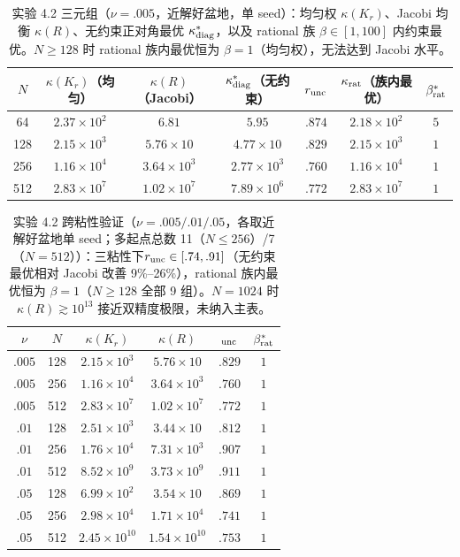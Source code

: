 \documentclass[fontset=windows,11pt]{ctexart}
\numberwithin{equation}{section}
\begin{document}
\begin{table}[ht]\centering\small\renewcommand{\arraystretch}{1.2}
\begin{tabular}{ccccccc}
\toprule
$N$ & $\kappa(K_r)$（均匀） & $\kappa(R)$（Jacobi） & $\kappa^*_{\rm diag}$（无约束） & $r_{\rm unc}$ & $\kappa_{\rm rat}$（族内最优） & $\beta^*_{\rm rat}$\\
\midrule
64  & $2.37\times10^2$ & $6.81$ & $5.95$ & $.874$ & $2.18\times10^2$ & $5$\\
128 & $2.15\times10^3$ & $5.76\times10$ & $4.77\times10$ & $.829$ & $2.15\times10^3$ & $1$\\
256 & $1.16\times10^4$ & $3.64\times10^3$ & $2.77\times10^3$ & $.760$ & $1.16\times10^4$ & $1$\\
512 & $2.83\times10^7$ & $1.02\times10^7$ & $7.89\times10^6$ & $.772$ & $2.83\times10^7$ & $1$\\
\bottomrule
\end{tabular}
\caption{实验 4.2 三元组（$\nu=.005$，近解好盆地，单 seed）：均匀权 $\kappa(K_r)$、Jacobi 均衡 $\kappa(R)$、无约束正对角最优 $\kappa^*_{\rm diag}$，以及 rational 族 $\beta\in[1,100]$ 内约束最优。$N\ge128$ 时 rational 族内最优恒为 $\beta=1$（均匀权），无法达到 Jacobi 水平。}\label{tab:f1d-triplet}
\end{table}
\begin{table}[ht]\centering\small\renewcommand{\arraystretch}{1.2}
\begin{tabular}{cccccc}
\toprule
$\nu$ & $N$ & $\kappa(K_r)$ & $\kappa(R)$ & $
_{\rm unc}$ & $\beta^*_{\rm rat}$\\
\midrule
$.005$ & 128 & $2.15\times10^3$ & $5.76\times10$ & $.829$ & $1$\\
$.005$ & 256 & $1.16\times10^4$ & $3.64\times10^3$ & $.760$ & $1$\\
$.005$ & 512 & $2.83\times10^7$ & $1.02\times10^7$ & $.772$ & $1$\\
\midrule
$.01$  & 128 & $2.51\times10^3$ & $3.44\times10$ & $.812$ & $1$\\
$.01$  & 256 & $1.76\times10^4$ & $7.31\times10^3$ & $.907$ & $1$\\
$.01$  & 512 & $8.52\times10^9$ & $3.73\times10^9$ & $.911$ & $1$\\
\midrule
$.05$  & 128 & $6.99\times10^2$ & $3.54\times10$ & $.869$ & $1$\\
$.05$  & 256 & $2.98\times10^4$ & $1.71\times10^4$ & $.741$ & $1$\\
$.05$ & 512 & $2.45\times10^{10}$ & $1.54\times10^{10}$ & $.753$ & $1$\\
\bottomrule
\end{tabular}
\caption{实验 4.2 跨粘性验证（$\nu=.005/.01/.05$，各取近解好盆地单 seed；多起点总数 11（$N\le256$）/7（$N=512$））：三粘性下$
r_{\rm unc}\in[.74,.91]$（无约束最优相对 Jacobi 改善 9\%--26\%），rational 族内最优恒为 $\beta=1$（$N\ge128$ 全部 9 组）。$N=1024$ 时 $\kappa(R)\gtrsim10^{13}$ 接近双精度极限，未纳入主表。}\label{tab:f1d-crossnu}
\end{table}
\end{document}
